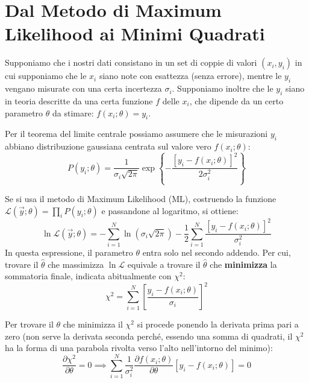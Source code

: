 \documentclass[openany,a4paper,12pt]{book}
\providecommand{\mathscr}[1]{\mathcal{#1}}
\theoremstyle{remark}
\begin{document}
\section{Dal Metodo di Maximum Likelihood ai Minimi Quadrati}



Supponiamo che i nostri dati consistano in un set di coppie di valori $(x_i, y_i)$ in cui supponiamo che le $x_i$ siano note con esattezza (senza errore), mentre le $y_i$ vengano misurate con una certa incertezza $\sigma_i$. 
Supponiamo inoltre che le $y_i$ siano in teoria descritte da una certa funzione $f$ delle $x_i$, che dipende da un certo parametro $\theta$ da stimare: $f(x_i; \theta) = y_i$.

Per il teorema del limite centrale possiamo assumere che le misurazioni $y_i$ abbiano distribuzione gaussiana centrata sul valore vero $f(x_i; \theta)$:
\begin{equation}
    P(y_i; \theta) = \frac{1}{\sigma_i \sqrt{2\pi}} \exp \left\{ -\frac{[y_i - f(x_i; \theta)]^2}{2\sigma_i^2} \right\}
\end{equation}

Se si usa il metodo di Maximum Likelihood (ML), costruendo la funzione $\mathscr{L}(\vec{y}; \theta) = \prod_i P(y_i; \theta)$ e passandone al logaritmo, si ottiene:
\begin{equation}
    \ln \mathscr{L}(\vec{y}; \theta) = -\sum_{i=1}^N \ln(\sigma_i \sqrt{2\pi}) - \frac{1}{2} \sum_{i=1}^N \frac{[y_i - f(x_i; \theta)]^2}{\sigma_i^2}
    \label{eq:lnL_min_quad}
\end{equation}
In questa espressione, il parametro $\theta$ entra solo nel secondo addendo. Per cui, trovare il $\hat{\theta}$ che massimizza $\ln \mathscr{L}$ equivale a trovare il $\hat{\theta}$ che \textbf{minimizza} la sommatoria finale, indicata abitualmente con $\chi^2$:
\begin{equation}
    \chi^2 = \sum_{i=1}^N \left[ \frac{y_i - f(x_i; \theta)}{\sigma_i} \right]^2
\end{equation}

Per trovare il $\theta$ che minimizza il $\chi^2$ si procede ponendo la derivata prima pari a zero (non serve la derivata seconda perché, essendo una somma di quadrati, il $\chi^2$ ha la forma di una parabola rivolta verso l'alto nell'intorno del minimo):
\begin{equation}
    \frac{\partial \chi^2}{\partial \theta} = 0 \implies \sum_{i=1}^N \frac{1}{\sigma_i^2} \frac{\partial f(x_i; \theta)}{\partial \theta}[y_i - f(x_i; \theta)] = 0
\end{equation}
\end{document}
